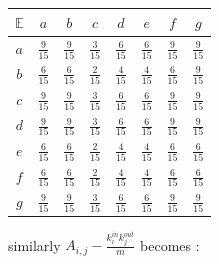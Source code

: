 \documentclass[a4paper, 12pt, twocolumn]{article}
\begin{document}
\begin{center}
       \begin{tabular}{c|ccccccc}
              $ \mathbb{E} $ & $ a $ & $ b $ & $ c $ & $ d $ & $ e $ & $ f $ & $ g $ \\
              \hline
              $ a $ & $ \frac{9}{15} $ & $ \frac{9}{15} $ & $ \frac{3}{15} $ & $ \frac{6}{15} $ & $ \frac{6}{15} $ & $ \frac{9}{15} $ & $ \frac{9}{15} $ \\
              $ b $ & $ \frac{6}{15} $ & $ \frac{6}{15} $ & $ \frac{2}{15} $ & $ \frac{4}{15} $ & $ \frac{4}{15} $ & $ \frac{6}{15} $ & $ \frac{9}{15} $ \\
              $ c $ & $ \frac{9}{15} $ & $ \frac{9}{15} $ & $ \frac{3}{15} $ & $ \frac{6}{15} $ & $ \frac{6}{15} $ & $ \frac{9}{15} $ & $ \frac{9}{15} $ \\
              $ d $ & $ \frac{9}{15} $ & $ \frac{9}{15} $ & $ \frac{3}{15} $ & $ \frac{6}{15} $ & $ \frac{6}{15} $ & $ \frac{9}{15} $ & $ \frac{9}{15} $ \\
              $ e $ & $ \frac{6}{15} $ & $ \frac{6}{15} $ & $ \frac{2}{15} $ & $ \frac{4}{15} $ & $ \frac{4}{15} $ & $ \frac{6}{15} $ & $ \frac{6}{15} $ \\
              $ f $ & $ \frac{6}{15} $ & $ \frac{6}{15} $ & $ \frac{2}{15} $ & $ \frac{4}{15} $ & $ \frac{4}{15} $ & $ \frac{6}{15} $ & $ \frac{6}{15} $ \\
              $ g $ & $ \frac{9}{15} $ & $ \frac{9}{15} $ & $ \frac{3}{15} $ & $ \frac{6}{15} $ & $ \frac{6}{15} $ & $ \frac{9}{15} $ & $ \frac{9}{15} $ \\
       \end{tabular}
\end{center}

similarly $ A_{i, j} - \frac{k_{i}^{in}k_{j}^{out}}{m} $ becomes :
\end{document}
